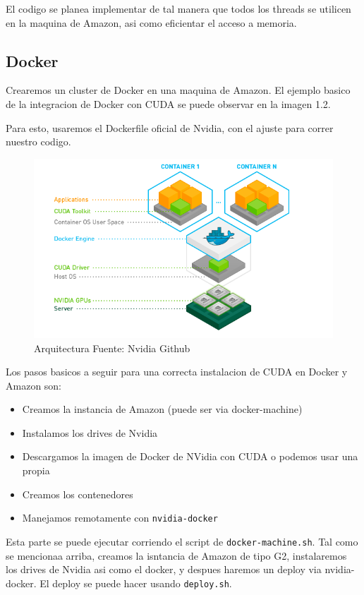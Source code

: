 \documentclass[]{article}
\providecommand{\tightlist}{%
  \setlength{\itemsep}{0pt}\setlength{\parskip}{0pt}}
\begin{document}
El codigo se planea implementar de tal manera que todos los threads se
utilicen en la maquina de Amazon, asi como eficientar el acceso a
memoria.

\subsection{Docker}\label{docker}

Crearemos un cluster de Docker en una maquina de Amazon. El ejemplo
basico de la integracion de Docker con CUDA se puede observar en la
imagen 1.2.

Para esto, usaremos el Dockerfile oficial de Nvidia, con el ajuste para
correr nuestro codigo.

\begin{figure}
\centering
\includegraphics{img/dockercuda.png}
\caption{Arquitectura Fuente: Nvidia Github}
\end{figure}

Los pasos basicos a seguir para una correcta instalacion de CUDA en
Docker y Amazon son:

\begin{itemize}
\tightlist
\item
  Creamos la instancia de Amazon (puede ser via docker-machine)
\item
  Instalamos los drives de Nvidia
\item
  Descargamos la imagen de Docker de NVidia con CUDA o podemos usar una
  propia
\item
  Creamos los contenedores
\item
  Manejamos remotamente con \texttt{nvidia-docker}
\end{itemize}

Esta parte se puede ejecutar corriendo el script de
\texttt{docker-machine.sh}. Tal como se mencionaa arriba, creamos la
isntancia de Amazon de tipo G2, instalaremos los drives de Nvidia asi
como el docker, y despues haremos un deploy via nvidia-docker. El deploy
se puede hacer usando \texttt{deploy.sh}.
\end{document}
